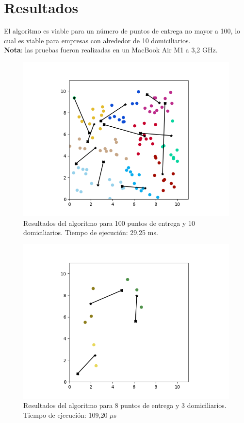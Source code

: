 \documentclass[runningheads]{llncs}
\begin{document}
\section{Resultados}
El algoritmo es viable para un número de puntos de entrega no mayor a 100, lo
cual es viable para empresas con alrededor de 10 domiciliarios.
\\
\textbf{Nota}: las pruebas fueron realizadas en un MacBook Air M1 a 3,2 GHz.
\begin{figure}
    \includegraphics[width=\textwidth]{result_1.png}
    \caption{Resultados del algoritmo para 100 puntos de entrega y 10 domiciliarios.
        Tiempo de ejecución: 29,25 ms.}
\end{figure}
\begin{figure}
    \includegraphics[width=\textwidth]{result_2.png}
    \caption{Resultados del algoritmo para 8 puntos de entrega y 3 domiciliarios.
        Tiempo de ejecución: 109,20 $\mu$s}
\end{figure}
\newpage
\end{document}
